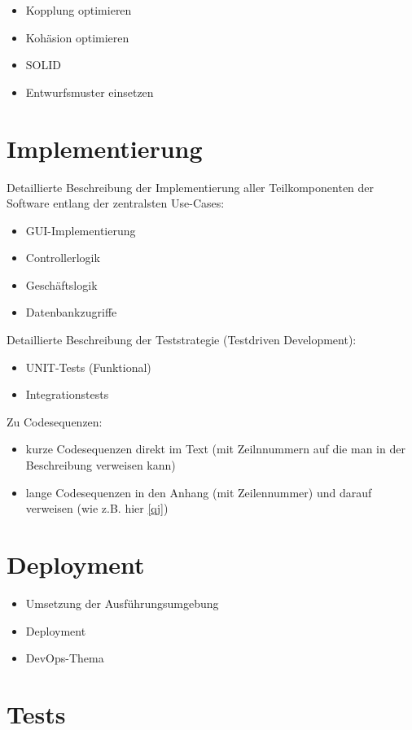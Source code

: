 \begin{itemize}
	\item Kopplung optimieren
	\item Kohäsion optimieren
	\item SOLID
	\item Entwurfsmuster einsetzen
\end{itemize}

\chapter{Implementierung}
Detaillierte Beschreibung der Implementierung aller Teilkomponenten der Software entlang der zentralsten Use-Cases:

\begin{itemize}
	\item GUI-Implementierung
	\item Controllerlogik
	\item Geschäftslogik
	\item Datenbankzugriffe
\end{itemize}

Detaillierte Beschreibung der Teststrategie (Testdriven Development):

\begin{itemize}
	\item UNIT-Tests (Funktional)
	\item Integrationstests
\end{itemize}

Zu Codesequenzen:
\begin{itemize}
	\item kurze Codesequenzen direkt im Text (mit Zeilnnummern auf die man in der Beschreibung verweisen kann)
	\item lange Codesequenzen in den Anhang (mit Zeilennummer) und darauf verweisen (wie z.B. hier \cref{qj})
\end{itemize}

\chapter{Deployment}
\begin{itemize}
	\item Umsetzung der Ausführungsumgebung
	\item Deployment
	\item DevOps-Thema
\end{itemize}

\chapter{Tests}

